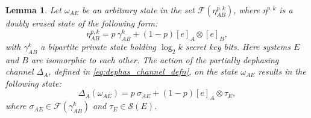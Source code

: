 \documentclass[10pt,a4paper]{amsart}
\newtheorem{lemma}{Lemma}
\begin{document}
\begin{lemma}\label{lem:dephas_ext_form}
    Let $\omega_{AE}$ be an arbitrary state in the set $\mathcal{F}\!\left(\eta^{p,k}_{AB}\right)$, where $\eta^{p,k}$ is a doubly erased state of the following form:
    \begin{equation}
        \eta^{p,k}_{AB} = p~\gamma^k_{AB} + (1-p)[e]_A\otimes[e]_B,
    \end{equation}
    with $\gamma^k_{AB}$ a bipartite private state holding $\log_2 k$ secret key bits. Here systems $E$ and $B$ are isomorphic to each other.
    The action of the partially dephasing channel $\Delta_A$, defined in \eqref{eq:dephas_channel_defn}, on the state $\omega_{AE}$ results in the following state:
    \begin{equation}
    \Delta_A\!\left(\omega_{AE}\right) = p~\sigma_{AE} + (1-p)[e]_A\otimes\tau_E,
    \end{equation}
    where $\sigma_{AE} \in \mathcal{F}\!\left(\gamma^k_{AB}\right)$ and $\tau_E \in \mathcal{S}\!\left(E\right)$.
\end{lemma}
\end{document}
